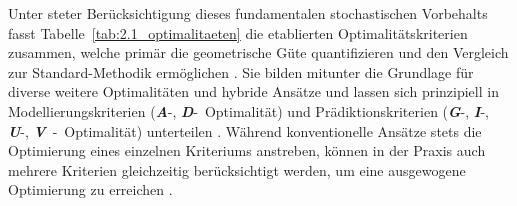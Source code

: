 Unter steter Berücksichtigung dieses fundamentalen stochastischen Vorbehalts fasst Tabelle~\ref{tab:2.1_optimalitaeten} die etablierten Optimalitätskriterien zusammen, welche primär die geometrische Güte quantifizieren und den Vergleich zur Standard-Methodik ermöglichen \cite{Goos.2011,Montgomery.2020}.
Sie bilden mitunter die Grundlage für diverse weitere Optimalitäten und hybride Ansätze und lassen sich prinzipiell in Modellierungskriterien (\textit{\textbf{A}}-, \textit{\textbf{D}}-~Optimalität) und Prädiktionskriterien (\textit{\textbf{G}}-, \textit{\textbf{I}}-, \textit{\textbf{U}}-, \textit{\textbf{V}}~-~Optimalität) unterteilen \cite{Myers.2016,Rigdon.2022}.
Während konventionelle Ansätze stets die Optimierung eines einzelnen Kriteriums anstreben, können in der Praxis auch mehrere Kriterien gleichzeitig berücksichtigt werden, um eine ausgewogene Optimierung zu erreichen \cite{Goos.2011,Walsh.2024}.

